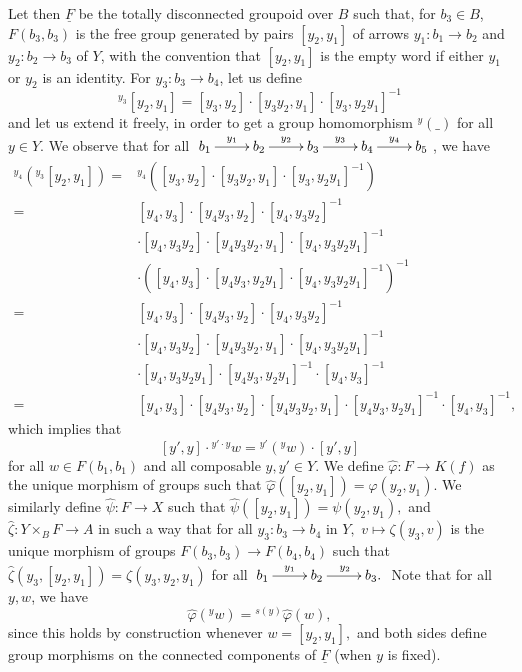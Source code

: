 \documentclass[11pt]{amsart}
\theoremstyle{plain}
\theoremstyle{definition}
\theoremstyle{remark}
\newcommand{\un}{\underline}
\begin{document}
Let then $\un{F}$ be the totally disconnected groupoid over $B$ such that, for $b_3 \in B$, $F(b_3, b_3)$ is the free group generated by pairs $[y_2,y_1]$ of arrows $y_1\colon b_1\to b_2$ and $y_2\colon b_2\to b_3$ of $Y$, with the convention that $[y_2,y_1]$ is the empty word if either $y_1$ or $y_2$ is an identity. For $y_3 \colon b_3 \to b_4$, let us define
\begin{equation} \label{eq:def_act}
	^{y_3}[y_2,y_1] = [y_3,y_2] \cdot [y_3y_2,y_1] \cdot [y_3,y_2y_1]^{-1}
\end{equation}
and let us extend it freely, in order to get a group homomorphism ${}^{y} (\_ )$ for all $y \in Y$. We observe that for all $\xymatrix{ b_1 \ar[r]^{y_1} & b_2 \ar[r]^{y_2} & b_3 \ar[r]^{y_3} & b_4 \ar[r]^{y_4} & b_5 }$, we have
\begin{align*}
	^{y_4} ({ ^{y_3} [y_2,y_1]}) = & {}^{y_4} ([y_3,y_2] \cdot [y_3y_2,y_1] \cdot [y_3,y_2y_1]^{-1}) \\
	= & [y_4,y_3] \cdot [y_4y_3,y_2] \cdot [y_4,y_3y_2]^{-1}\\
	& \cdot [y_4,y_3y_2] \cdot [y_4y_3y_2,y_1] \cdot [y_4,y_3y_2y_1]^{-1} \\
	& \cdot ([y_4,y_3] \cdot [y_4y_3,y_2y_1] \cdot [y_4,y_3y_2y_1]^{-1})^{-1}\\
	= &  [y_4,y_3] \cdot [y_4y_3,y_2] \cdot [y_4,y_3y_2]^{-1}\\
	& \cdot [y_4,y_3y_2] \cdot [y_4y_3y_2,y_1] \cdot [y_4,y_3y_2y_1]^{-1} \\
	& \cdot [y_4,y_3y_2y_1]  \cdot  [y_4y_3,y_2y_1]^{-1} \cdot  [y_4,y_3]^{-1} \\
	= &  [y_4,y_3] \cdot [y_4y_3,y_2] \cdot [y_4y_3y_2,y_1] \cdot [y_4y_3,y_2y_1]^{-1} \cdot  [y_4,y_3]^{-1},
\end{align*}
which implies that
\begin{equation} \label{eq:act_CF}
	[y',y] \cdot {}^{y'\cdot y} w = {}^{y'}({}^{y} w) \cdot [y',y]
\end{equation}
for all $w\in F(b_1, b_1)$ and all composable $y, y' \in Y.$ We define $\widehat{\varphi} \colon F \to K(f)$ as the unique morphism of groups such that $\widehat{\varphi}([y_2,y_1]) = \varphi(y_2,y_1)$. We similarly define $\widehat{\psi} \colon F \to X $ such that $\widehat{\psi}([y_2,y_1])= \psi (y_2,y_1),$ and $\widehat{\zeta}\colon Y\times_B F\to A$ in such a way that for all $y_3\colon b_3\to b_4$ in $Y,$ $v\mapsto\zeta(y_3,v)$ is the unique morphism of groups $F(b_3, b_3) \to F(b_4, b_4)$ such that $\widehat{\zeta} (y_3,[y_2,y_1]) = \zeta(y_3,y_2,y_1)$ for all $\xymatrix{ b_1 \ar[r]^{y_1} & b_2 \ar[r]^{y_2} & b_3. }$ Note that for all $y,w$, we have
\[\widehat{\varphi}({}^{y}w) = {}^{s(y)}\widehat{\varphi}(w),\]
since this holds by construction whenever $w=[y_2,y_1],$ and both sides define group morphisms on the connected components of $\un{F}$ (when $y$ is fixed).
\end{document}
